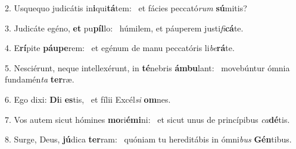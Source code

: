 2. Usquequo judicátis in\textbf{i}qui\textbf{tá}tem: \ast\  et fácies peccató\textit{rum} \textbf{sú}mitis?\

3. Judicáte egéno, \textbf{et} pu\textbf{píl}lo: \ast\  húmilem, et páuperem justi\textit{fi}\textbf{cá}te.\

4. E\textbf{rí}pite \textbf{páu}\textbf{pe}rem: \ast\  et egénum de manu peccatóris li\textit{be}\textbf{rá}te.\

5. Nesciérunt, neque intellexérunt, in \textbf{té}nebris \textbf{ám}\textbf{bu}lant: \ast\  movebúntur ómnia fundamén\textit{ta} \textbf{ter}ræ.\

6. Ego dixi: \textbf{Di}i \textbf{es}tis, \ast\  et fílii Excél\textit{si} \textbf{om}nes.\

7. Vos autem sicut hómines \textbf{mo}ri\textbf{é}\textbf{mi}ni: \ast\  et sicut unus de princípibus \textit{ca}\textbf{dé}tis.\

8. Surge, Deus, \textbf{jú}dica \textbf{ter}ram: \ast\  quóniam tu hereditábis in ómni\textit{bus} \textbf{Gén}tibus.\

